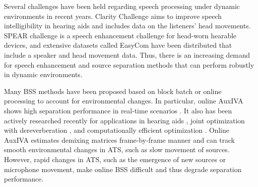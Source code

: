 \documentclass[sip,biber]{now-journal}
\begin{document}
Several challenges have been held regarding speech processing under dynamic environments in recent years.
Clarity Challenge \cite{Akeroyd:2023:ICASSP} aims to improve speech intelligibility in hearing aids and includes data on the listeners' head movements.
SPEAR challenge \cite{Guiraud:2022:IWAENC} is a speech enhancement challenge for head-worn hearable devices, and extensive datasets called EasyCom \cite{Donley:2021:arxiv} have been distributed that include a speaker and head movement data.
Thus, there is an increasing demand for speech enhancement and source separation methods that can perform robustly in dynamic environments.

Many BSS methods have been proposed based on block batch \cite{Koldovsky:2019:ICASSP,Koldovsky:2021:SP,Jansky:2022:ASMP} or online processing \cite{Kim:2010:CASI,Taniguchi:2014:HSCMA} to account for environmental changes.
In particular, online AuxIVA shows high separation performance in real-time scenarios \cite{Taniguchi:2014:HSCMA}.
It also has been actively researched recently for applications in hearing aids \cite{Sunohara:2017:ICASSP}, joint optimization with dereverberation \cite{Ueda:2021:ICASSP}, and computationally efficient optimization \cite{Nakashima:2023:ICASSP}.
Online AuxIVA estimates demixing matrices frame-by-frame manner and can track smooth environmental changes in ATS, such as slow movement of sources.
However, rapid changes in ATS, such as the emergence of new sources or microphone movement, make online BSS difficult and thus degrade separation performance.
\end{document}
